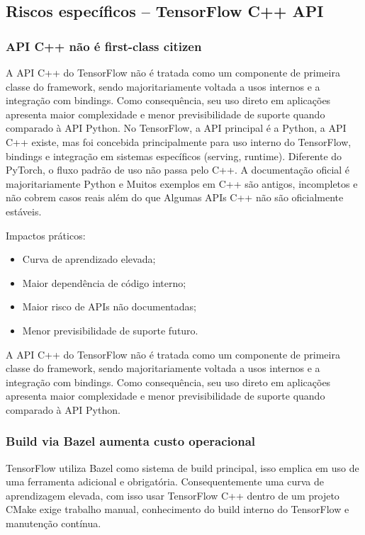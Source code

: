 \subsection{Riscos específicos – TensorFlow C++ API}

\subsubsection{API C++ não é first-class citizen}

A API C++ do TensorFlow não é tratada como um componente de primeira classe do framework, sendo majoritariamente voltada a usos internos e a integração com bindings. Como consequência, seu uso direto em aplicações apresenta maior complexidade e menor previsibilidade de suporte quando comparado à API Python.
No TensorFlow, a API principal é a Python, a API C++ existe, mas foi concebida principalmente para
uso interno do TensorFlow, bindings e integração em sistemas específicos (serving, runtime).
Diferente do PyTorch, o fluxo padrão de uso não passa pelo C++.
A documentação oficial é majoritariamente Python e Muitos exemplos em C++ são antigos, incompletos e não cobrem casos reais além do que Algumas APIs C++ não são oficialmente estáveis.

Impactos práticos: 

\begin{itemize} 
    \item Curva de aprendizado elevada;
    \item Maior dependência de código interno;
    \item Maior risco de APIs não documentadas;
    \item Menor previsibilidade de suporte futuro.
\end{itemize}

A API C++ do TensorFlow não é tratada como um componente de primeira classe do framework, sendo majoritariamente voltada a usos internos e a integração com bindings. Como consequência, seu uso direto em aplicações apresenta maior complexidade e menor previsibilidade de suporte quando comparado à API Python.

\subsubsection{Build via Bazel aumenta custo operacional}

TensorFlow utiliza Bazel como sistema de build principal, isso emplica em uso de uma ferramenta adicional e obrigatória. Consequentemente uma curva de aprendizagem elevada, com isso usar TensorFlow C++ dentro de um projeto CMake exige trabalho manual, conhecimento do build interno do TensorFlow e manutenção contínua.

